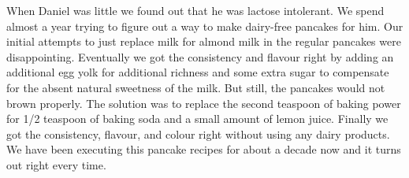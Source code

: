 \documentclass[11pt,letterpaper]{article}
\begin{document}



When Daniel was little we found out that he was lactose intolerant. We spend almost a year trying to figure out a way to make dairy-free pancakes for him. Our initial attempts to just replace milk for almond milk in the regular pancakes were disappointing. Eventually we got the consistency and flavour right by adding an additional egg yolk for additional richness and some extra sugar to compensate for the absent natural sweetness of the milk. But still, the pancakes would not brown properly. The solution was to replace the second teaspoon of baking power for 1/2 teaspoon of baking soda and a small amount of lemon juice. Finally we got the consistency, flavour, and colour right without using any dairy products. We have been executing this pancake recipes for about a decade now and it turns out right every time.
\end{document}
